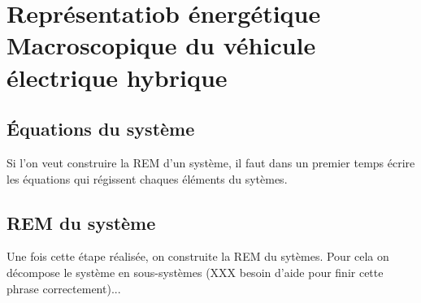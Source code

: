 \section{Représentatiob énergétique Macroscopique du véhicule électrique hybrique}

\subsection{Équations du système}

Si l'on veut construire la REM d'un système, il faut dans un premier temps écrire les équations qui régissent chaques éléments du sytèmes. 


\subsection{REM du système}
Une fois cette étape réalisée, on construite la REM du sytèmes. Pour cela on décompose le système en sous-systèmes (XXX besoin d'aide pour finir cette phrase correctement)...


 
